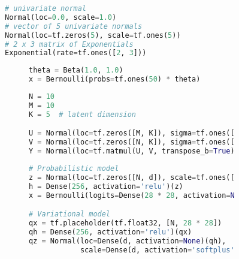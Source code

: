 \documentclass{article} %
\title{}
\author{}
\begin{document}
\maketitle

\begin{figure}[t]
\centering
\begin{lstlisting}[language=python]
# univariate normal
Normal(loc=0.0, scale=1.0)
# vector of 5 univariate normals
Normal(loc=tf.zeros(5), scale=tf.ones(5))
# 2 x 3 matrix of Exponentials
Exponential(rate=tf.ones([2, 3]))
\end{lstlisting}
\caption{}
\end{figure}

\begin{figure}[t]
\begin{subfigure}{0.3\columnwidth}
  \centering
\begin{lstlisting}[language=python]
theta = Beta(1.0, 1.0)
x = Bernoulli(probs=tf.ones(50) * theta)
\end{lstlisting}
\end{subfigure}%
\begin{subfigure}{0.65\columnwidth}
  \centering
  
\end{subfigure}
\caption{}
\end{figure}

\begin{figure}[t]
\begin{subfigure}{0.3\columnwidth}
  \centering
  
\end{subfigure}%
\begin{subfigure}{0.7\columnwidth}
\begin{lstlisting}[language=python]
N = 10
M = 10
K = 5  # latent dimension

U = Normal(loc=tf.zeros([M, K]), sigma=tf.ones([M, K]))
V = Normal(loc=tf.zeros([N, K]), sigma=tf.ones([N, K]))
Y = Normal(loc=tf.matmul(U, V, transpose_b=True), sigma=tf.ones([N, M]))
\end{lstlisting}
\end{subfigure}
\caption{}
\end{figure}

\begin{figure}[t]
\begin{subfigure}{0.225\columnwidth}
  \centering
  
\end{subfigure}%
\begin{subfigure}{0.65\columnwidth}
  \centering
\begin{lstlisting}[language=python]
# Probabilistic model
z = Normal(loc=tf.zeros([N, d]), scale=tf.ones([N, d]))
h = Dense(256, activation='relu')(z)
x = Bernoulli(logits=Dense(28 * 28, activation=None)(h))

# Variational model
qx = tf.placeholder(tf.float32, [N, 28 * 28])
qh = Dense(256, activation='relu')(qx)
qz = Normal(loc=Dense(d, activation=None)(qh),
            scale=Dense(d, activation='softplus')(qh))
\end{lstlisting}
\end{subfigure}
\caption{}
\end{figure}
\end{document}
